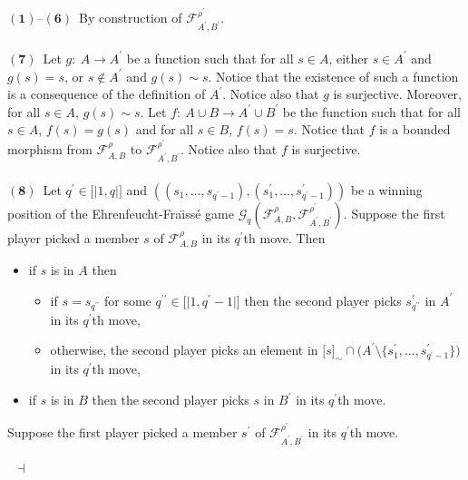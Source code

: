 \documentclass[draft]{article}
\newenvironment{proof}{{\bf Proof:}}{~$\dashv$\\}
\def\lsem{{\lbrack\mid}}
\def\rsem{{\mid\rbrack}}
\begin{document}
%
%
\begin{proof}
%
%
$\mathbf{(1)}$--$\mathbf{(6)}$~By construction of ${\mathcal F}_{A^{\prime},B^{\prime}}^{\rho^{\prime}}$.
%
%
\\
\\
%
%
$\mathbf{(7)}$~Let $g:\ A{\longrightarrow}A^{\prime}$ be a function such that for all $s{\in}A$, either $s{\in}A^{\prime}$ and $g(s){=}s$, or $s{\not\in}A^{\prime}$ and $g(s){\sim}s$.
Notice that the existence of such a function is a consequence of the definition of $A^{\prime}$.
Notice also that $g$ is surjective.
Moreover, for all $s{\in}A$, $g(s){\sim}s$.
Let $f:\ A{\cup}B{\longrightarrow}A^{\prime}{\cup}B^{\prime}$ be the function such that for all $s{\in}A$, $f(s){=}g(s)$ and for all $s{\in}B$, $f(s){=}s$.
Notice that $f$ is a bounded morphism from ${\mathcal F}_{A,B}^{\rho}$ to ${\mathcal F}_{A^{\prime},B^{\prime}}^{\rho^{\prime}}$.
Notice also that $f$ is surjective.
%
%
\\
\\
%
%
$\mathbf{(8)}$~Let $q^{\prime}{\in}\lsem1,q\rsem$ and $((s_{1},\ldots,s_{q^{\prime}{-}1}),(s^{\prime}_{1},\ldots,s^{\prime}_{q^{\prime}{-}1}))$ be a winning position of the Ehrenfeucht-Fra\"\i ss\'e game ${\mathcal G}_{q}({\mathcal F}_{A,B}^{\rho},{\mathcal F}_{A^{\prime},B^{\prime}}^{\rho^{\prime}})$.
Suppose the first player picked a member $s$ of ${\mathcal F}_{A,B}^{\rho}$ in its $q^{\prime}$th move.
Then
%
%
\begin{itemize}
%
%
\item if $s$ is in $A$ then
%
%
\begin{itemize}
%
%
\item if $s{=}s_{q^{\prime\prime}}$ for some $q^{\prime\prime}{\in}\lsem1,q^{\prime}{-}1\rsem$ then the second player picks $s^{\prime}_{q^{\prime\prime}}$ in $A^{\prime}$ in its $q^{\prime}$th move,
%
%
\item otherwise, the second player picks an element in $\lbrack s\rbrack_{\sim}{\cap}(A^{\prime}{\setminus}\{s^{\prime}_{1},\ldots,
%
%
%
%
%
%
%
%
%
%
%
%
$\linebreak$
%
%
%
%
%
%
%
%
%
%
%
%
s^{\prime}_{q^{\prime}{-}1}\})$ in its $q^{\prime}$th move,
%
%
\end{itemize}
%
%
\item if $s$ is in $B$ then the second player picks $s$ in $B^{\prime}$ in its $q^{\prime}$th move.
%
%
\end{itemize}
%
%
Suppose the first player picked a member $s^{\prime}$ of ${\mathcal F}_{A^{\prime},B^{\prime}}^{\rho^{\prime}}$ in its $q^{\prime}$th move.

\end{proof}
\end{document}

